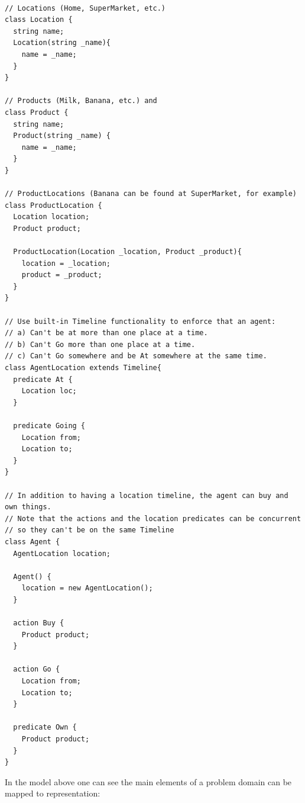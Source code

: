 \begin{verbatim}

// Locations (Home, SuperMarket, etc.)
class Location {
  string name;
  Location(string _name){
    name = _name;
  }
}

// Products (Milk, Banana, etc.) and
class Product {
  string name;
  Product(string _name) {
    name = _name;
  }
}

// ProductLocations (Banana can be found at SuperMarket, for example)
class ProductLocation {
  Location location;
  Product product;

  ProductLocation(Location _location, Product _product){
    location = _location;
    product = _product;
  }
}

// Use built-in Timeline functionality to enforce that an agent:
// a) Can't be at more than one place at a time.
// b) Can't Go more than one place at a time.
// c) Can't Go somewhere and be At somewhere at the same time.
class AgentLocation extends Timeline{
  predicate At {
    Location loc;
  }

  predicate Going {
    Location from;
    Location to;
  }
}

// In addition to having a location timeline, the agent can buy and own things.  
// Note that the actions and the location predicates can be concurrent 
// so they can't be on the same Timeline
class Agent {
  AgentLocation location;

  Agent() {
    location = new AgentLocation();
  }

  action Buy {
    Product product;
  }
  
  action Go {
    Location from;
    Location to;
  }
  
  predicate Own {
  	Product product;
  }
}
\end{verbatim}

In the model above one can see the main elements of a problem domain
can be mapped to \eus representation:

